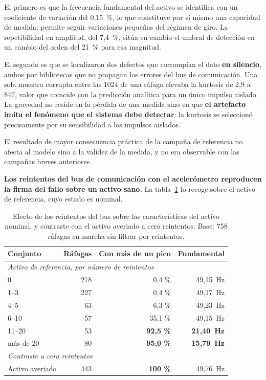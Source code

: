 El primero es que la frecuencia fundamental del activo se identifica con un coeficiente de
variación del \mbox{0,15 \%}, lo que constituye por sí mismo una capacidad de medida: permite
seguir variaciones pequeñas del régimen de giro. La repetibilidad en amplitud, del \mbox{7,4 \%},
sitúa en cambio el umbral de detección en un cambio del orden del \mbox{21 \%} para esa magnitud.

El segundo es que se localizaron dos defectos que corrompían el dato \textbf{en silencio}, ambos
por bibliotecas que no propagan los errores del bus de comunicación. Una sola muestra corrupta
entre las 1024 de una ráfaga elevaba la kurtosis de 2,9 a 847, valor que coincide con la
predicción analítica para un único impulso aislado. La gravedad no reside en la pérdida de una
medida sino en que \textbf{el artefacto imita el fenómeno que el sistema debe detectar}: la
kurtosis se seleccionó precisamente por su sensibilidad a los impulsos aislados.

El resultado de mayor consecuencia práctica de la campaña de referencia no afecta al modelo sino
a la validez de la medida, y no era observable con las campañas breves anteriores.

\textbf{Los reintentos del bus de comunicación con el acelerómetro reproducen la firma del
fallo sobre un activo sano.} La tabla~\ref{table:reintentos-artefacto} lo recoge sobre el
activo de referencia, cuyo estado es nominal.

\begin{table}[ht!]
\caption{Efecto de los reintentos del bus sobre las características del activo nominal, y contraste con el activo averiado a cero reintentos. Base: 758 ráfagas en marcha sin filtrar por reintentos.}
\label{table:reintentos-artefacto}
\centering
\begin{tabular}{|l|r|r|r|}
\hline
\textbf{Conjunto} & \textbf{Ráfagas} & \textbf{Con más de un pico} & \textbf{Fundamental} \\
\hline
\multicolumn{4}{|l|}{\textit{Activo de referencia, por número de reintentos}} \\
\hline
0 & 278 & 0,4 \% & \mbox{49,15 Hz} \\
\hline
1--3 & 227 & 0,4 \% & \mbox{49,17 Hz} \\
\hline
4--5 & 63 & 6,3 \% & \mbox{49,23 Hz} \\
\hline
6--10 & 57 & 35,1 \% & \mbox{49,15 Hz} \\
\hline
11--20 & 53 & \textbf{92,5 \%} & \textbf{\mbox{21,40 Hz}} \\
\hline
más de 20 & 80 & \textbf{95,0 \%} & \textbf{\mbox{15,79 Hz}} \\
\hline
\multicolumn{4}{|l|}{\textit{Contraste a cero reintentos}} \\
\hline
Activo averiado & 443 & \textbf{100 \%} & \mbox{49,76 Hz} \\
\hline
\end{tabular}
\end{table}

